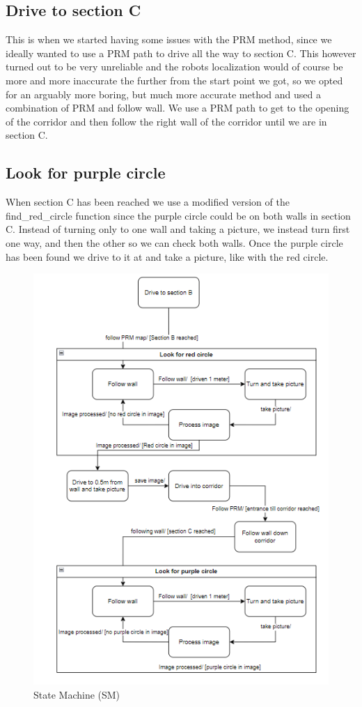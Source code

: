 \documentclass{article}
\begin{document}
	\subsection*{Drive to section C}
	This is when we started having some issues with the PRM method, since we ideally wanted to use a PRM path to drive all the way to section C. This however turned out to be very unreliable and the robots localization would of course be more and more inaccurate the further from the start point we got, so we opted for an arguably more boring, but much more accurate method and used a combination of  PRM and follow wall. We use a PRM path to get to the opening of the corridor and then follow the right wall of the corridor until we are in section C.
	
	\subsection*{Look for purple circle}
	When section C has been reached we use a modified version of the find\_red\_circle function since the purple circle could be on both walls in section C. Instead of turning only to one wall and taking a picture, we instead turn first one way, and then the other so we can check both walls.
	Once the purple circle has been found we drive to it at and take a picture, like with the red circle.
	\begin{figure}
		\centering
		\includegraphics[width=.4\textwidth]{fig/fig12.png}
		\caption{State Machine (SM)}
		\label{fig:fig12}
	\end{figure}
	\clearpage
\end{document}
